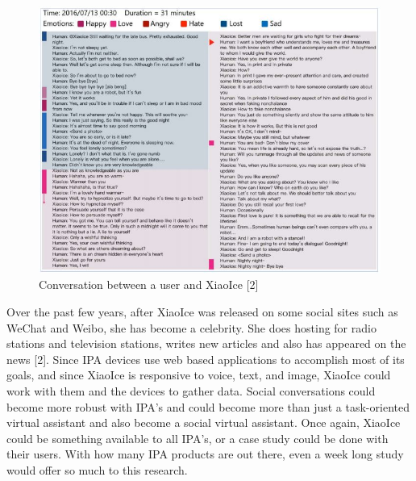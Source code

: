 \documentclass[letterpaper, 10 pt, conference]{IEEEtran}
\begin{document}
\begin{figure}
\renewcommand\figurename{Fig.}
\centering
\includegraphics{Conversationexample.png}
\caption{Conversation between a user and XiaoIce [2]}
\end{figure} 

\par Over the past few years, after XiaoIce was released on some social sites such as WeChat and Weibo, she has become a celebrity. She does hosting for radio stations and television stations, writes new articles and also has appeared on the news [2]. Since IPA devices use web based applications to accomplish most of its goals, and since XiaoIce is responsive to voice, text, and image, XiaoIce could work with them and the devices to gather data. Social conversations could become more robust with IPA's and could become more than just a task-oriented virtual assistant and also become a social virtual assistant. Once again, XiaoIce could be something available to all IPA's, or a case study could be done with their users. With how many IPA products are out there, even a week long study would offer so much to this research.
\end{document}

